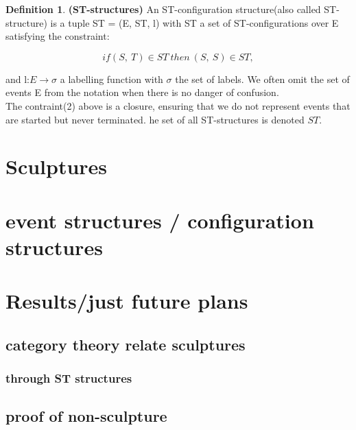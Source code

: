\documentclass[9pt, english, a4paper]{article}
\theoremstyle{definition}
\newtheorem{definition}{Definition}[section]
\begin{document}
	\theoremstyle{definition}
	\begin{definition}{\textbf{(ST-structures)}}
		An ST-configuration structure(also called ST-structure) is a tuple ST = (E, ST, l) with ST a set of ST-configurations over E satisfying the constraint:

		\begin{equation}
			if(S,\ T) \in ST\ then\ (S,\ S) \in ST,
		\end{equation}

	\noindent and l:$E \rightarrow \sigma$ a labelling function with $\sigma$ the set of labels. We often omit the set of events E from the notation when  there is no danger of confusion.\\

	The contraint(2) above is a closure, ensuring that we do not represent events that are started but never terminated. he set of all ST-structures is denoted $ST$. 

	\end{definition}


\section{Sculptures}




\section{event structures / configuration structures}



\section{Results/just future plans}



\subsection{category theory relate sculptures}



\subsubsection{through ST structures}



\subsection{proof of non-sculpture}
\end{document}
